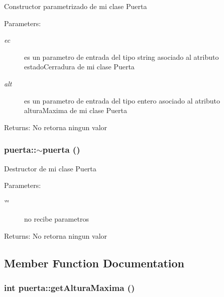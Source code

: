 Constructor parametrizado de mi clase Puerta \begin{Desc}
\item[Parameters:]
\begin{description}
\item[{\em ec}]es un parametro de entrada del tipo string asociado al atributo estadoCerradura de mi clase Puerta \item[{\em alt}]es un parametro de entrada del tipo entero asociado al atributo alturaMaxima de mi clase Puerta \end{description}
\end{Desc}
\begin{Desc}
\item[Returns:]No retorna ningun valor \end{Desc}
\hypertarget{classpuerta_207e0983ca66391ee628453dffcf619f}{
\subsubsection[$\sim$puerta]{\setlength{\rightskip}{0pt plus 5cm}puerta::$\sim$puerta ()}}
\label{classpuerta_207e0983ca66391ee628453dffcf619f}


Destructor de mi clase Puerta \begin{Desc}
\item[Parameters:]
\begin{description}
\item[{\em \char`\"{}\char`\"{}}]no recibe parametros \end{description}
\end{Desc}
\begin{Desc}
\item[Returns:]No retorna ningun valor \end{Desc}


\subsection{Member Function Documentation}
\hypertarget{classpuerta_facb52e11a8a2b23437d4d0821187edc}{
\subsubsection[getAlturaMaxima]{\setlength{\rightskip}{0pt plus 5cm}int puerta::getAlturaMaxima ()}}
\label{classpuerta_facb52e11a8a2b23437d4d0821187edc}


